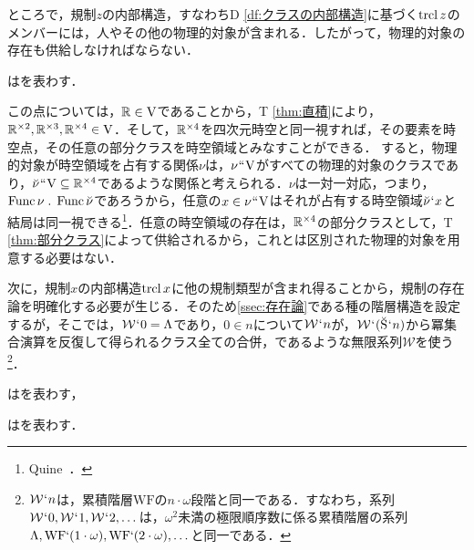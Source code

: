ところで，規制$ z $の内部構造，すなわちD \ref{df:クラスの内部構造}に基づく$ \operatorname{trcl} z $のメンバーには，人やその他の物理的対象が含まれる．したがって，物理的対象の存在も供給しなければならない．

\begin{df}
\label{df:クラスの内部構造}
\kagi{$
    \trcl\alpha
$}はを表わす．
\end{df}

\noindent この点については，$ \mathbb{R}\in\mathrm{V} $であることから，T \ref{thm:直積}により，$ \mathbb{R}^{\times 2},\mathbb{R}^{\times 3},\mathbb{R}^{\times 4}\in\mathrm{V} $．そして，$ \mathbb{R}^{\times 4} $を四次元時空と同一視すれば，その要素を時空点，その任意の部分クラスを時空領域とみなすことができる．
すると，物理的対象が時空領域を占有する関係$\nu$は，$\nu{\mspace{1mu}{``}\mspace{1mu}}\mathrm{V}$がすべての物理的対象のクラスであり，$\breve{\nu}{\mspace{1mu}{``}\mspace{1mu}}\mathrm{V}\subseteq\mathbb{R}^{\times 4}$であるような関係と考えられる．$\nu$は一対一対応，つまり，$ \func{\nu}\con{1}\func{\breve{\nu}} $であろうから，任意の$x\in\nu{\mspace{1mu}{``}\mspace{1mu}}\mathrm{V}$はそれが占有する時空領域$\breve{\nu}{\mspace{1mu}{`}\mspace{1mu}} x$と結局は同一視できる\footnote{
    Quine~\cite{Quine}．
}．任意の時空領域の存在は，$ \mathbb{R}^{\times 4} $の部分クラスとして，T \ref{thm:部分クラス}によって供給されるから，これとは区別された物理的対象を用意する必要はない．

次に，規制$x$の内部構造$\operatorname{trcl} x$に他の規制類型が含まれ得ることから，規制の存在論を明確化する必要が生じる．そのため\ref{ssec:存在論}である種の階層構造を設定するが，そこでは，$\mathcal{W}{\mspace{1mu}{`}\mspace{1mu}} 0 = \Lambda$であり，$ 0 \in n $について$\mathcal{W}{\mspace{1mu}{`}\mspace{1mu}} n$が，$\mathcal{W}{\mspace{1mu}{`}\mspace{1mu}} (\breve{\mathrm{S}}{\mspace{1mu}{`}\mspace{1mu}} n)$から冪集合演算を反復して得られるクラス全ての合併，であるような無限系列$\mathcal{W}$を使う\footnote{
    $ \mathcal{W}{\mspace{1mu}{`}\mspace{1mu}} n $は，累積階層$ \mathrm{WF} $の$ n\cdot\omega $段階と同一である．すなわち，系列$ \mathcal{W}{\mspace{1mu}{`}\mspace{1mu}} 0,\mathcal{W}{\mspace{1mu}{`}\mspace{1mu}} 1,\mathcal{W}{\mspace{1mu}{`}\mspace{1mu}} 2,\dots $は，$ \omega^{2} $未満の極限順序数に係る累積階層の系列$ \Lambda,\mathrm{WF}{`}(1\cdot\omega),\mathrm{WF}{`}(2\cdot\omega),\dots $と同一である．
}．

\begin{df}
\label{df:冪集合演算}
はを表わす，
\end{df}

\begin{df}
\label{df:階層構造}
はを表わす．
\end{df}


